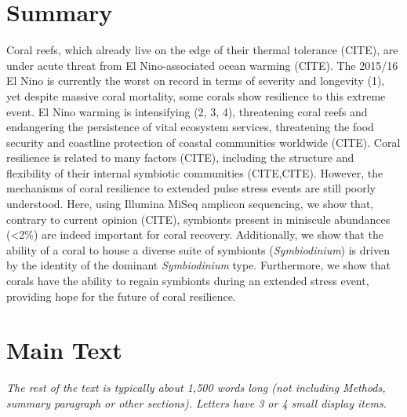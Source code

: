 \documentclass[]{article}
\begin{document}
\section{Summary}\label{summary}

Coral reefs, which already live on the edge of their thermal tolerance
(CITE), are under acute threat from El Nino-associated ocean warming
(CITE). The 2015/16 El Nino is currently the worst on record in terms of
severity and longevity (1), yet despite massive coral mortality, some
corals show resilience to this extreme event. El Nino warming is
intensifying (2, 3, 4), threatening coral reefs and endangering the
persistence of vital ecosystem services, threatening the food security
and coastline protection of coastal communities worldwide (CITE). Coral
resilience is related to many factors (CITE), including the structure
and flexibility of their internal symbiotic communities (CITE,CITE).
However, the mechanisms of coral resilience to extended pulse stress
events are still poorly understood. Here, using Illumina MiSeq amplicon
sequencing, we show that, contrary to current opinion (CITE), symbionts
present in miniscule abundances (\textless{}2\%) are indeed important
for coral recovery. Additionally, we show that the ability of a coral to
house a diverse suite of symbionts (\emph{Symbiodinium}) is driven by
the identity of the dominant \emph{Symbiodinium} type. Furthermore, we
show that corals have the ability to regain symbionts during an extended
stress event, providing hope for the future of coral resilience.

\section{Main Text}\label{main-text}

\emph{The rest of the text is typically about 1,500 words long (not
including Methods, summary paragraph or other sections). Letters have 3
or 4 small display items.}
\end{document}
